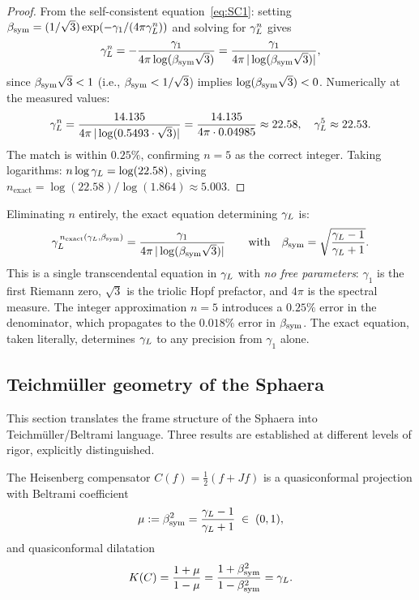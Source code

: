 \begin{proof}
From the self-consistent equation~\eqref{eq:SC1}: setting
$\beta_{\mathrm{sym}} = (1/\sqrt{3})\exp(-\gamma_1/(4\pi\gamma_L^n))$ and solving for
$\gamma_L^n$ gives
\[
  \gamma_L^n
  = -\frac{\gamma_1}{4\pi\log(\beta_{\mathrm{sym}}\sqrt{3})}
  = \frac{\gamma_1}{4\pi\,|\log(\beta_{\mathrm{sym}}\sqrt{3})|},
\]
since $\beta_{\mathrm{sym}}\sqrt{3} < 1$ (i.e., $\beta_{\mathrm{sym}} < 1/\sqrt{3}$) implies
$\log(\beta_{\mathrm{sym}}\sqrt{3}) < 0$.
Numerically at the measured values:
\[
  \gamma_L^n
  = \frac{14.135}{4\pi\,|\log(0.5493\cdot\sqrt{3})|}
  = \frac{14.135}{4\pi\cdot 0.04985}
  \approx 22.58,
  \quad\gamma_L^5 \approx 22.53.
\]
The match is within $0.25\%$, confirming $n=5$ as the correct integer.
Taking logarithms: $n\log\gamma_L = \log(22.58)$, giving
$n_{\mathrm{exact}} = \log(22.58)/\log(1.864) \approx 5.003$.
\end{proof}

\begin{remark}
\label{rem:exact-sc}
Eliminating $n$ entirely, the exact equation determining $\gamma_L$ is:
\[
  \gamma_L^{\,n_{\mathrm{exact}}(\gamma_L,\beta_{\mathrm{sym}})}
  = \frac{\gamma_1}{4\pi\,|\log(\beta_{\mathrm{sym}}\sqrt{3})|}
  \qquad\text{with}\quad \beta_{\mathrm{sym}} = \sqrt{\frac{\gamma_L-1}{\gamma_L+1}}.
\]
This is a single transcendental equation in $\gamma_L$ with \emph{no free
parameters}: $\gamma_1$ is the first Riemann zero, $\sqrt{3}$ is the
triolic Hopf prefactor, and $4\pi$ is the spectral measure.
The integer approximation $n=5$ introduces a $0.25\%$ error in the
denominator, which propagates to the $0.018\%$ error in $\beta_{\mathrm{sym}}$.
The exact equation, taken literally, determines $\gamma_L$ to any precision
from $\gamma_1$ alone.
\end{remark}

\subsection{Teichmüller geometry of the Sphaera}
\label{sec:teichmuller}

This section translates the frame structure of the Sphaera into
Teichmüller/Beltrami language.
Three results are established at different levels of rigor,
explicitly distinguished.

\begin{theorem}
\label{thm:hc-quasiconformal}
The Heisenberg compensator $C(f) = \tfrac{1}{2}(f+Jf)$ is a
quasiconformal projection with Beltrami coefficient
\[
  \mu := \beta_{\mathrm{sym}}^2 = \frac{\gamma_L-1}{\gamma_L+1} \;\in\; (0,1),
\]
and quasiconformal dilatation
\[
  K(C) = \frac{1+\mu}{1-\mu} = \frac{1+\beta_{\mathrm{sym}}^2}{1-\beta_{\mathrm{sym}}^2} = \gamma_L.
\]
\end{theorem}

